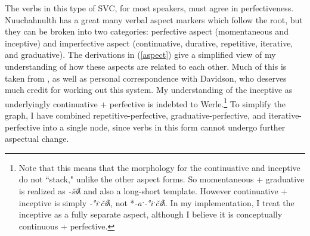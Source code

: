 The verbs in this type of SVC, for most speakers, must agree in perfectiveness. Nuuchahnulth has a great many verbal aspect markers which follow the root, but they can be broken into two categories: perfective aspect (momentaneous and inceptive) and imperfective aspect (continuative, durative, repetitive, iterative, and graduative). The derivations in (\ref{aspect}) give a simplified view of my understanding of how these aspects are related to each other. Much of this is taken from \cite{davidson2002}, as well as personal correspondence with Davidson, who deserves much credit for working out this system. My understanding of the inceptive as underlyingly continuative + perfective is indebted to Werle.\footnote{Note that this means that the morphology for the continuative and inceptive do not ``stack," unlike the other aspect forms. So momentaneous + graduative is realized as \textit{-šiƛ} and also a long-short template. However continuative + inceptive is simply \textit{-°iˑčiƛ}, not *\textit{-aˑ-°iˑčiƛ}. In my implementation, I treat the inceptive as a fully separate aspect, although I believe it is conceptually continuous + perfective.} To simplify the graph, I have combined repetitive-perfective, graduative-perfective, and iterative-perfective into a single node, since verbs in this form cannot undergo further aspectual change.

\begin{comment}
\ex \label{aspect}
\vspace{-20pt}
\xe
\begin{tikzpicture}[sibling distance=10em,
  every node/.style = {shape=rectangle, align=center}]]
\node (root) at (8,4.5) {Root};
\node (mo) at (2,2) {Momentaneous};
\node (ct) at (6,2) {Continuative};
\node (dr) at (8.5,2) {Durative};
\node (rp) at (12,2) {Repetitive};
\node (it) at (15,2) {Iterative};
\node (in) at (2, 0) {Inceptive};
\node (gr) at (5.5, 0) {Graduative};
\node (pf) at (2, -2) {*-Perfective};
\node (*pf) at (15, -2.14) {};
\draw[->] (root) -- (mo) node[midway,fill=white] {-šiƛ};
\draw[->] (root) -- (ct) node[midway,fill=white] {-aˑ};
\draw[->] (root) -- (dr) node[midway,fill=white] {-uk/-L.ḥi};
\draw[->] (root) -- (rp) node[midway,fill=white] {-LR2L.a};
\draw[->] (root) -- (it) node[midway,fill=white] {-LR2L.š};
\draw[->] (mo) -- (gr) node[near start,fill=lightgray] {-LS};
\draw[->] (in) -- (gr) node[near start,fill=lightgray] {-LS};
\draw[->] (ct) -- (in) node[near start,fill=white] {-°iˑčiƛ};
\draw[->] (dr) -- (gr) node[midway,fill=white] {-LS};
\draw[->] (gr) -- (pf) node[near end,fill=lightgray] {-šiƛ};
\begin{scope}[on background layer]
\node[bigbox, fit=(ct)(dr)(it)(gr)(*pf), fill=white] (impf) {};
\node[below left] at (impf.north east) {\textit{imperfective aspect}};
\node[bigbox, fit=(mo)(pf), fill=lightgray] (perf) {};
\node[below right] at (perf.north west) {\textit{perfective aspect}};
\draw[->] (rp) -- (pf);
\draw[->] (it) -- (pf);
\draw[->] (dr) -- (pf);
\end{scope}
\end{tikzpicture}
\end{comment}


